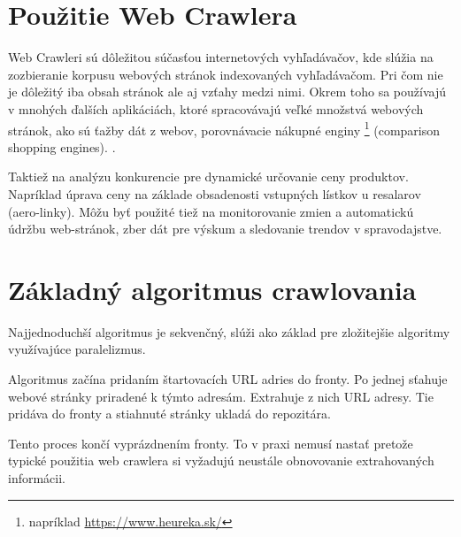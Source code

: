 \section{Použitie Web Crawlera}
Web Crawleri sú dôležitou súčasťou internetových vyhľadávačov, kde slúžia na zozbieranie korpusu webových stránok indexovaných vyhľadávačom. Pri čom nie je dôležitý iba obsah stránok ale aj vzťahy medzi nimi. Okrem toho sa používajú v mnohých ďalších aplikáciách, ktoré spracovávajú veľké množstvá webových stránok, ako sú ťažby dát z webov, porovnávacie nákupné enginy \footnote{ napríklad \url{https://www.heureka.sk/}} (comparison shopping engines). \cite{encykOfDatabases}.  

Taktiež na analýzu konkurencie pre dynamické určovanie ceny produktov. Napríklad úprava ceny na základe obsadenosti vstupných lístkov u resalarov (aero-linky). 
Môžu byť použité tiež na monitorovanie zmien a automatickú údržbu web-stránok, zber dát pre výskum a sledovanie trendov v spravodajstve. 

\section{Základný algoritmus crawlovania}
Najjednoduchší algoritmus je sekvenčný, slúži ako základ pre zložitejšie algoritmy využívajúce paralelizmus. 

Algoritmus začína pridaním štartovacích URL adries do fronty. Po jednej sťahuje webové stránky priradené k týmto adresám. Extrahuje z nich URL adresy. Tie pridáva do fronty a stiahnuté stránky ukladá do repozitára.

Tento proces končí vyprázdnením fronty. To v praxi nemusí nastať pretože typické použitia web crawlera si vyžadujú neustále obnovovanie extrahovaných informácii.

